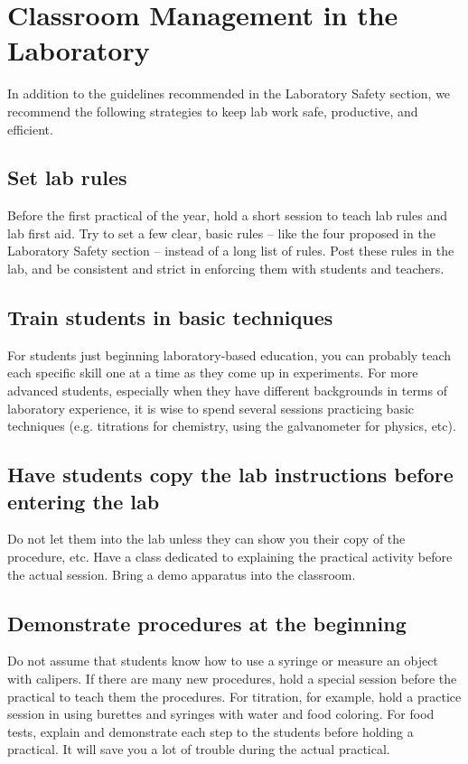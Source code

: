 \chapter{Classroom Management in the Laboratory}

In addition to the guidelines recommended 
in the Laboratory Safety section, 
we recommend the following strategies to keep lab work safe, 
productive, 
and efficient.

\section{Set lab rules}
Before the first practical of the year, 
hold a short session to teach lab rules and lab first aid. 
Try to set a few clear, 
basic rules – 
like the four proposed in the Laboratory Safety section – 
instead of a long list of rules. 
Post these rules in the lab, 
and be consistent and strict 
in enforcing them with students and teachers.

\section{Train students in basic techniques}
For students just beginning laboratory-based education, 
you can probably teach each specific skill 
one at a time as they come up in experiments. 
For more advanced students, 
especially when they have different backgrounds 
in terms of laboratory experience, 
it is wise to spend several sessions practicing basic techniques (e.g. 
titrations for chemistry, 
using the galvanometer for physics, 
etc).

\section{Have students copy the lab instructions before entering the lab}
Do not let them into the lab unless 
they can show you their copy of the procedure, 
etc. 
Have a class dedicated to explaining 
the practical activity before the actual session. 
Bring a demo apparatus into the classroom.

\section{Demonstrate procedures at the beginning}
Do not assume that students know how to use a syringe 
or measure an object with calipers. 
If there are many new procedures, 
hold a special session before the practical to teach them the procedures. 
For titration, for example, 
hold a practice session in using burettes 
and syringes with water and food coloring. 
For food tests, 
explain and demonstrate each step to the students 
before holding a practical. 
It will save you a lot of trouble during the actual practical.

